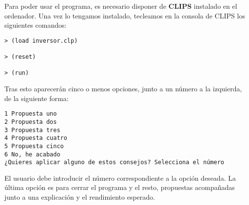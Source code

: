 \documentclass[11pt,openany]{book} %
\begin{document}
Para poder usar el programa, es necesario disponer de \textbf{\textcolor{ocre}{CLIPS}} instalado en el ordenador. Una vez lo tengamos instalado, tecleamos en la consola de CLIPS los siguientes comandos:

\begin{verbatim}
> (load inversor.clp)

> (reset)

> (run)
\end{verbatim}

Tras esto aparecerán cinco o menos opciones, junto a un número a la izquierda, de la siguiente forma:

\begin{verbatim}
1 Propuesta uno
2 Propuesta dos
3 Propuesta tres
4 Propuesta cuatro
5 Propuesta cinco
6 No, he acabado
¿Quieres aplicar alguno de estos consejos? Selecciona el número
\end{verbatim}

El usuario debe introducir el número correspondiente a la opción deseada. La última opción es para cerrar el programa y el resto, propuestas acompañadas junto a una explicación y el rendimiento esperado.
\end{document}
